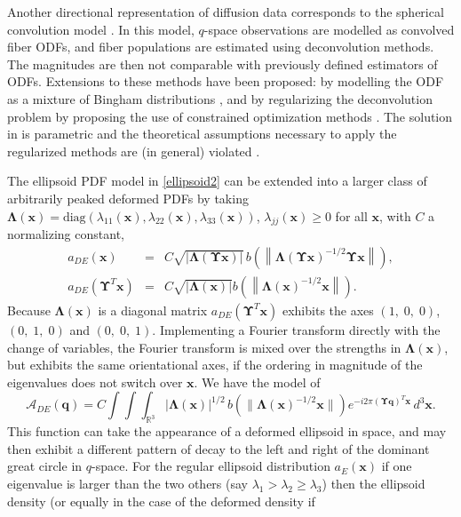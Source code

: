 \documentclass[dvips,aoas,preprint]{imsart}
\numberwithin{equation}{section}
\theoremstyle{plain}
\newcommand{\q}{\mathbf{q}}
\newcommand{\x}{\mathbf{x}}
\newcommand{\cA}{\mathcal{A}}
\newcommand{\bs}[1]{\boldsymbol{#1}}
\begin{document}
Another directional representation of diffusion data corresponds to
the spherical convolution model \citep{Tournier}.  In this model,
$q$-space observations are modelled as convolved fiber ODFs, and fiber
populations are estimated using deconvolution methods. The magnitudes
are then not comparable with previously defined estimators of ODFs.
Extensions to these methods have been proposed: by modelling the ODF
as a mixture of Bingham distributions \citep{Kaden2007}, and by
regularizing the deconvolution problem by proposing the use of
constrained optimization methods \citep{Jian2007}.  The solution in
\citet{Kaden2007} is parametric and the theoretical assumptions
necessary to apply the regularized methods are (in general) violated
\citep{Jian2007}.

The ellipsoid PDF model in \eqref{ellipsoid2} can be extended into a
larger class of arbitrarily peaked deformed PDFs by taking
$\bm{\Lambda}(\x)={\text{diag}}(\lambda_{11}(\x),\lambda_{22}(\x),\lambda_{33}(\x))$,
$\lambda_{jj}(\x)\ge0$ for all $\x$, with $C$ a normalizing constant,
\begin{eqnarray}%
  a_{DE}(\x) &=& C \sqrt{|\bs{\Lambda}(\bs{\Upsilon}\x)|} \,
  b\left(\left\|\bs{\Lambda}(\bs{\Upsilon}\x)^{-1/2}
  \bs{\Upsilon}\x\right\|\right),\\ 
  a_{DE}(\bs{\Upsilon}^T\x) &=& C \sqrt{|\bs{\Lambda}(\x)|}
  b\left(\left\|\bs{\Lambda}(\x)^{-1/2}\x\right\|\right).
\end{eqnarray}
Because $\bs{\Lambda}(\x)$ is a diagonal matrix
$a_{DE}(\bs{\Upsilon}^T\x)$ exhibits the axes $(1,\;0,\;0)$,
$(0,\;1,\;0)$ and $(0,\;0,\;1)$.  Implementing a Fourier transform
directly with the change of variables, the Fourier transform is mixed
over the strengths in $\bs{\Lambda}(\x)$, but exhibits the same
orientational axes, if the ordering in magnitude of the eigenvalues does not switch over $\x$.  We have the model of
\begin{equation}\label{deformedell}
  {\cA}_{DE}(\q) = C \int\int\int_{\mathbb{R}^3}
  |\bs{\Lambda}(\x)|^{1/2} \,
  b\left(\|\bs{\Lambda}(\x)^{-1/2}\x\|\right)
  e^{-i2\pi(\bs{\Upsilon}\q)^T\x} \, d^3\x.
\end{equation}
This function can take the appearance of a deformed ellipsoid in
space, and may then exhibit a different pattern of decay to the left
and right of the dominant great circle in $q$-space.  For the regular
ellipsoid distribution $a_E(\x)$ if one eigenvalue is larger than the
two others (say $\lambda_1>\lambda_2\ge\lambda_3$) then the ellipsoid
density (or equally in the case of the deformed density if
\end{document}
